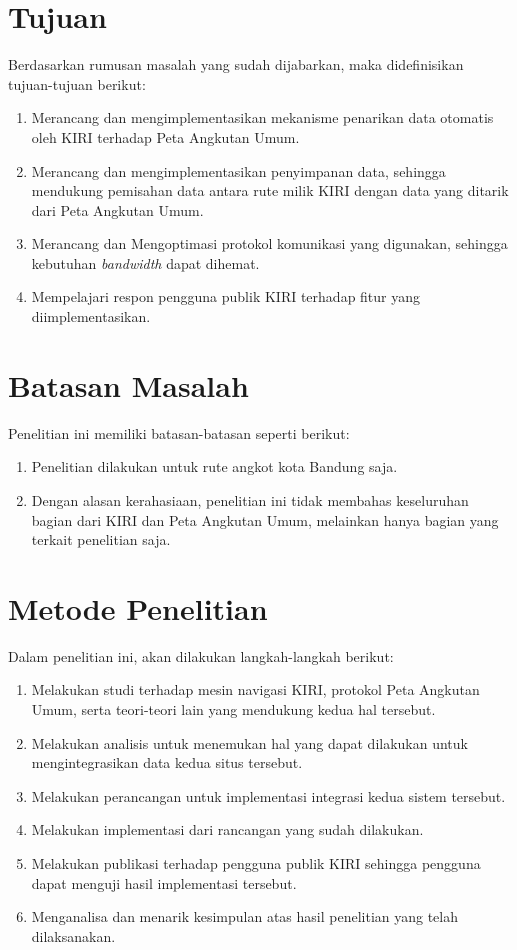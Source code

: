 \section{Tujuan}

Berdasarkan rumusan masalah yang sudah dijabarkan, maka didefinisikan tujuan-tujuan berikut:

\begin{enumerate}
	\item Merancang dan mengimplementasikan mekanisme penarikan data otomatis oleh KIRI terhadap Peta Angkutan Umum.
	\item Merancang dan mengimplementasikan penyimpanan data, sehingga mendukung pemisahan data antara rute milik KIRI dengan data yang ditarik dari Peta Angkutan Umum.
	\item Merancang dan Mengoptimasi protokol komunikasi yang digunakan, sehingga kebutuhan \textit{bandwidth} dapat dihemat.
	\item Mempelajari respon pengguna publik  KIRI terhadap fitur yang diimplementasikan.
\end{enumerate}

\section{Batasan Masalah}

Penelitian ini memiliki batasan-batasan seperti berikut:

\begin{enumerate}
	\item Penelitian dilakukan untuk rute angkot kota Bandung saja.
	\item Dengan alasan kerahasiaan, penelitian ini tidak membahas keseluruhan bagian dari KIRI dan Peta Angkutan Umum, melainkan hanya bagian yang terkait penelitian saja.
\end{enumerate}

\section{Metode Penelitian}

Dalam penelitian ini, akan dilakukan langkah-langkah berikut:

\begin{enumerate}
	\item Melakukan studi terhadap mesin navigasi KIRI, protokol Peta Angkutan Umum, serta teori-teori lain yang mendukung kedua hal tersebut.
	\item Melakukan analisis untuk menemukan hal yang dapat dilakukan untuk mengintegrasikan data kedua situs tersebut.
	\item Melakukan perancangan untuk implementasi integrasi kedua sistem tersebut.
	\item Melakukan implementasi dari rancangan yang sudah dilakukan.
	\item Melakukan publikasi terhadap pengguna publik KIRI sehingga pengguna dapat menguji hasil implementasi tersebut.
	\item Menganalisa dan menarik kesimpulan atas hasil penelitian yang telah dilaksanakan.
\end{enumerate}

